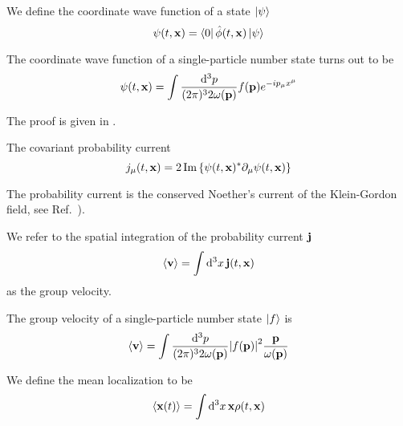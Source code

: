 \begin{definition}
	We define the coordinate wave function of a state $\ket{\psi}$
	\begin{equation}
		\psi(t,\vb{x})
		=
		\bra{0}\hat\phi(t,\vb{x})\ket{\psi}
	\end{equation}
\end{definition}
\begin{lemma}\label{thm:single_particle_number_state_wave_function}
	The coordinate wave function of a single-particle number state turns out to be
	\begin{equation}
		\psi(t,\vb{x})
		=
		\int\frac{\dd[3]{p}}{(2\pi)^32\omega(\vb{p})}
		f(\vb{p})e^{-ip_\mu x^\mu}
	\end{equation}
\end{lemma}
The proof is given in .
\begin{definition}
	The covariant probability current
	\begin{equation}
		j_\mu(t,\vb{x})
		=
		2
		\operatorname{\operatorname{Im}}\left\{
			\psi(t,\vb{x})^*
			\partial_\mu
			\psi(t,\vb{x})
		\right\}
		\label{eq:qkg_probability_current}
	\end{equation}	
\end{definition}
The probability current is the conserved Noether's current of the Klein-Gordon field, see Ref.~\cite[p.~18]{Peskin1995}).
\begin{definition}
	We refer to the spatial integration of the probability current $\vb{j}$
	\begin{equation}
		\expval{\vb{v}}
		=
		\int\dd[3]{x}
		\vb{j}(t,\vb{x})
		\label{eq:group_velocity}
	\end{equation}
	as the group velocity.
\end{definition}
\begin{lemma}\label{thm:single_particle_number_state_group_velocity}
	The group velocity of a single-particle number state $\ket{f}$ is
	\begin{equation}
		\expval{\vb{v}}
		=
		\int\frac{\dd[3]{p}}{(2\pi)^32\omega(\vb{p})}
		\abs{f(\vb{p})}^2
		\frac{\vb{p}}{\omega(\vb{p})}
		\label{eq:single_particle_number_state_group_velocity}
	\end{equation}
\end{lemma}
\begin{definition}
	We define the mean localization to be
	\begin{equation}
		\expval{\vb{x}(t)}
		=
		\int\dd[3]{x}
		\vb{x}
		\rho(t,\vb{x})
	\end{equation}
\end{definition}
